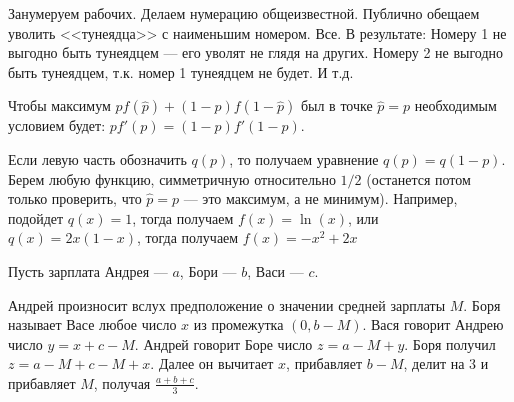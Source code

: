 \begin{solution}{6.46}

\end{solution}
\begin{solution}{6.47}

\end{solution}
\begin{solution}{6.48}

\end{solution}
\begin{solution}{6.49}

\end{solution}
\begin{solution}{6.50}

\end{solution}
\begin{solution}{6.51}

\end{solution}
\begin{solution}{6.52}

\end{solution}
\begin{solution}{6.53}
Занумеруем рабочих. Делаем нумерацию общеизвестной. Публично обещаем уволить <<тунеядца>> с наименьшим номером. Все. В результате: Номеру 1 не выгодно быть тунеядцем --- его уволят не глядя на других. Номеру 2 не выгодно быть тунеядцем, т.к. номер 1 тунеядцем не будет. И т.д.
\end{solution}
\begin{solution}{6.54}

Чтобы максимум $p f(\hat{p})+(1-p)f(1-\hat{p})$ был в точке
$\hat{p}=p$ необходимым условием будет:
$pf'(p)=(1-p)f'(1-p)$. \par
Если левую часть обозначить $q(p)$, то получаем уравнение
$q(p)=q(1-p)$. Берем любую функцию, симметричную относительно
$1/2$ (останется потом только проверить, что $\hat{p}=p$ --- это
максимум, а не минимум). Например, подойдет $q(x)=1$, тогда
получаем $f(x)=\ln(x)$, или $q(x)=2x(1-x)$, тогда получаем
$f(x)=-x^{2}+2x$
\end{solution}
\begin{solution}{6.55}

\end{solution}
\begin{solution}{6.56}

Пусть зарплата Андрея --- $a$, Бори --- $b$, Васи --- $c$.

Андрей произносит вслух предположение о значении средней зарплаты $M$.
Боря называет Васе любое число $x$ из промежутка $(0, b-M)$. Вася говорит Андрею число $y=x+c-M$. Андрей говорит Боре число $z= a-M+y$. Боря получил $z = a-M+c-M+x$. Далее он вычитает $x$, прибавляет $b-M$, делит на 3 и прибавляет $M$, получая $\frac{a+b+c}{3}$.
\end{solution}
